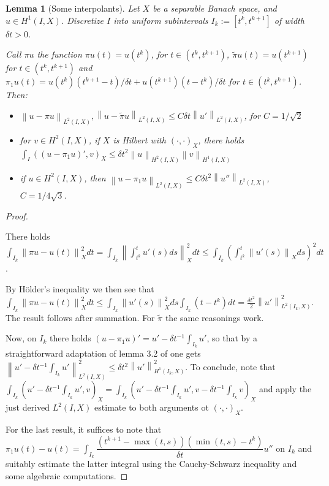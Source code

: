 \documentclass[english,a4paper,9pt,oneside]{scrbook}	%
\theoremstyle{break}
\newtheorem{lemma}[equation]{Lemma}
\newenvironment{mproof}[1][\proofname]{%
  \begin{proof}[#1]$ $\par\nobreak\ignorespaces
}{%
  \end{proof}
}
\renewcommand*{\proofname}{Proof}
\theoremstyle{remark}
\newcommand{\ds}{\displaystyle}
\newcommand{\norm}[1]{\left\lVert#1\right\rVert}
\begin{document}
\begin{appendices}
\begin{lemma}[Some interpolants]
\label{lemma:pw_constant_appr}
Let $X$ be a separable Banach space, and $u \in H^1(I,X)$. Discretize $I$ into uniform subintervals $I_k:=[t^k,t^{k+1}]$ of width $\delta t>0$.

Call $\pi u $ the function $\pi u(t)=u(t^{k})$, for $t \in (t^k,t^{k+1})$, $\tilde{\pi}u(t) = u(t^{k+1})$ for $t \in (t^k,t^{k+1})$ and $\pi_1 u(t) = u(t^k)(t^{k+1}-t)/\delta t + u(t^{k+1})(t-t^k)/\delta t$ for $t \in (t^k,t^{k+1})$. Then:

\begin{itemize}
	\item $\norm{u-\pi u}_{L^2(I,X)}, \norm{u-\tilde{\pi }u}_{L^2(I,X)}\leq C \delta t \norm{u'}_{L^2(I,X)}$, for $C=1/\sqrt{2}$
	\item for $v \in H^2(I,X)$, if $X$ is Hilbert with $(\cdot, \cdot)_X$, there holds $\ds \int_I ((u-\pi_1 u)',v)_X \leq \delta t^2 \norm{u}_{H^2(I,X)}\norm{v}_{H^1(I,X)} $
	\item if $u \in H^2(I,X)$, then $\norm{u-\pi_1 u}_{L^2(I,X)}\leq C\delta t^2\norm{u''}_{L^2(I,X)}$, $C = 1/4\sqrt{3}$.
\end{itemize}

\end{lemma}

\begin{mproof}
There holds $\ds \int_{I_k}\norm{\pi u - u(t)}_X^2 dt = \int_{I_k} \norm{\int_{t^k}^{t} u'(s)ds}_X^2 dt\leq \int_{I_k}\left ( \int_{t^k}^{t} \norm{u'(s)}_X ds \right )^2 dt$. 

By Hölder's inequality we then see that $ \ds \int_{I_k}\norm{\pi u - u(t)}_X^2 dt \leq  \int_{I_k} \norm{u'(s)}_X^2 ds  \int_{I_k}(t-t^k)dt = \frac{\delta t ^2}{2} \norm{u'}_{L^2(I_k,X)}^2$. The result follows after summation. For $\tilde{\pi}$ the same reasonings work.

Now, on $I_k$ there holds $(u-\pi_1 u)' = u'-\delta t^{-1}\ds \int_{I_k} u'$, so that by a straightforward adaptation of lemma 3.2 of \cite{lshou} one gets $\norm{u'-\delta t^{-1}\ds \int_{I_k} u'}_{L^2(I,X)}^2\leq \delta t^2 \norm{u'}_{H^1(I_k,X)}^2$. To conclude, note that $\ds \int_{I_k} \left ( u' - \delta t^{-1} \int_{I_k}u', v\right )_X = \int_{I_k} \left ( u' - \delta t^{-1} \int_{I_k}u', v - \delta t^{-1} \int_{I_k}v\right )_X$ and apply the just derived $L^2(I,X)$ estimate to both arguments ot $(\cdot,\cdot)_X$.

For the last result, it suffices to note that $\pi_1 u(t) - u(t) = \ds \int_{I_k} \dfrac{(t^{k+1}-\max(t,s))(\min(t, s)-t^k)}{\delta t}u''$ on $I_k$ and suitably estimate the latter integral using the Cauchy-Schwarz inequality and some algebraic computations.
\end{mproof}


\end{appendices}
\end{document}
